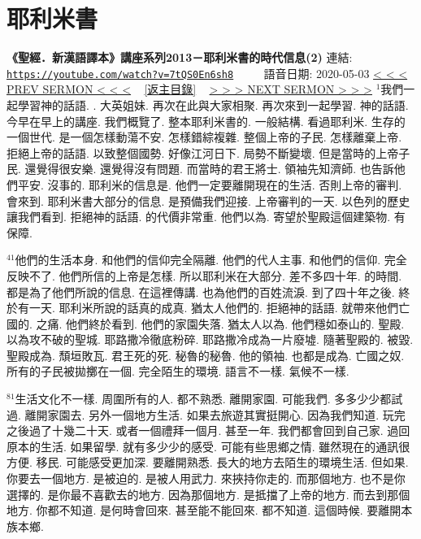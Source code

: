\documentclass{book}
\begin{document}
\section{耶利米書}
\label{sec:7tQS0En6sh8}
\textbf{《聖經．新漢語譯本》講座系列2013－耶利米書的時代信息(2)}
\newline
\newline
連結: \href{https://youtube.com/watch?v=7tQS0En6sh8}{\texttt{https://youtube.com/watch?v=7tQS0En6sh8}} ~~~~ 語音日期: 2020-05-03
\newline
\newline
\hyperref[sec:WEwyO2xJwfc]{\small{< < < PREV SERMON < < <}}
~
\hyperref[sec:index]{\small{[返主目錄]}}
~
\hyperref[sec:KKs6xvdps8w]{\small{> > > NEXT SERMON > > >}}
\newline
\newline
$^{1}$我們一起學習神的話語.
.
大英姐妹.
再次在此與大家相聚.
再次來到一起學習.
神的話語.
今早在早上的講座.
我們概覽了.
整本耶利米書的.
一般結構.
看過耶利米.
生存的一個世代.
是一個怎樣動蕩不安.
怎樣錯綜複雜.
整個上帝的子民.
怎樣離棄上帝.
拒絕上帝的話語.
以致整個國勢.
好像江河日下.
局勢不斷變壞.
但是當時的上帝子民.
還覺得很安樂.
還覺得沒有問題.
而當時的君王將士.
領袖先知濟師.
也告訴他們平安.
沒事的.
耶利米的信息是.
他們一定要離開現在的生活.
否則上帝的審判.
會來到.
耶利米書大部分的信息.
是預備我們迎接.
上帝審判的一天.
以色列的歷史讓我們看到.
拒絕神的話語.
的代價非常重.
他們以為.
寄望於聖殿這個建築物.
有保障.

$^{41}$他們的生活本身.
和他們的信仰完全隔離.
他們的代人主事.
和他們的信仰.
完全反映不了.
他們所信的上帝是怎樣.
所以耶利米在大部分.
差不多四十年.
的時間.
都是為了他們所說的信息.
在這裡傳講.
也為他們的百姓流淚.
到了四十年之後.
終於有一天.
耶利米所說的話真的成真.
猶太人他們的.
拒絕神的話語.
就帶來他們亡國的.
之痛.
他們終於看到.
他們的家園失落.
猶太人以為.
他們穩如泰山的.
聖殿.
以為攻不破的聖城.
耶路撒冷徹底粉碎.
耶路撒冷成為一片廢墟.
隨著聖殿的.
被毀.
聖殿成為.
頹垣敗瓦.
君王死的死.
秘魯的秘魯.
他的領袖.
也都是成為.
亡國之奴.
所有的子民被拋擲在一個.
完全陌生的環境.
語言不一樣.
氣候不一樣.

$^{81}$生活文化不一樣.
周圍所有的人.
都不熟悉.
離開家園.
可能我們.
多多少少都試過.
離開家園去.
另外一個地方生活.
如果去旅遊其實挺開心.
因為我們知道.
玩完之後過了十幾二十天.
或者一個禮拜一個月.
甚至一年.
我們都會回到自己家.
過回原本的生活.
如果留學.
就有多少少的感受.
可能有些思鄉之情.
雖然現在的通訊很方便.
移民.
可能感受更加深.
要離開熟悉.
長大的地方去陌生的環境生活.
但如果.
你要去一個地方.
是被迫的.
是被人用武力.
來挾持你走的.
而那個地方.
也不是你選擇的.
是你最不喜歡去的地方.
因為那個地方.
是抵擋了上帝的地方.
而去到那個地方.
你都不知道.
是何時會回來.
甚至能不能回來.
都不知道.
這個時候.
要離開本族本鄉.
\end{document}
